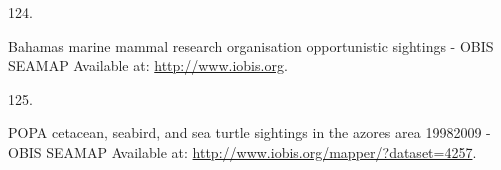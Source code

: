 \documentclass{article}
\newlength{\cslhangindent}
\newlength{\csllabelwidth}
\newlength{\cslentryspacingunit} %
\newenvironment{CSLReferences}[2] %
 {%
  \setlength{\parindent}{0pt}
  \ifodd #1
  \let\oldpar\par
  \def\par{\hangindent=\cslhangindent\oldpar}
  \fi
  \setlength{\parskip}{#2\cslentryspacingunit}
 }%
 {}
\newcommand{\CSLLeftMargin}[1]{\parbox[t]{\csllabelwidth}{#1}}
\newcommand{\CSLRightInline}[1]{\parbox[t]{\linewidth - \csllabelwidth}{#1}\break}
\begin{document}
\begin{CSLReferences}{0}{0}
\leavevmode{}%
\CSLLeftMargin{124. }%
\CSLRightInline{Bahamas marine mammal research organisation
opportunistic sightings - OBIS SEAMAP Available at:
\url{http://www.iobis.org}.}

\leavevmode{}%
\CSLLeftMargin{125. }%
\CSLRightInline{POPA cetacean, seabird, and sea turtle sightings in the
azores area 1998{\textendash}2009 - OBIS SEAMAP Available at:
\url{http://www.iobis.org/mapper/?dataset=4257}.}

\end{CSLReferences}



\end{document}
